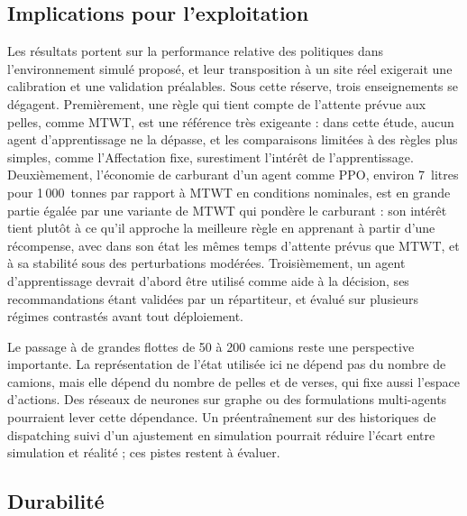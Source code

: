 \documentclass[11pt,a4paper]{article}
\newif\ifrevmarks
\newcommand{\revtag}[1]{\ifrevmarks\textsuperscript{\textcolor{red!70!black}{\scriptsize[#1]}}\fi}
\newenvironment{revbloc}[1]{\par\ifrevmarks\color{revcolor}\noindent\revtag{#1}\ \fi}{\par}
\newif\ifcorrmarks
\newcommand{\corr}[1]{\ifcorrmarks\textcolor{corrcolor}{#1}\else#1\fi}
\begin{document}
\subsection{Implications pour l'exploitation}

\begin{revbloc}{T31}
Les résultats portent sur la performance relative des politiques dans l'environnement simulé proposé, et leur transposition à un site réel exigerait une calibration et une validation préalables. Sous cette réserve, trois enseignements se dégagent. Premièrement, une règle qui tient compte de l'attente prévue aux pelles, comme MTWT, est une référence très exigeante : dans cette étude, aucun agent d'apprentissage ne la dépasse, et les comparaisons limitées à des règles plus simples, comme l'Affectation fixe, surestiment l'intérêt de l'apprentissage. \corr{Deuxièmement, l'économie de carburant d'un agent comme PPO, environ 7~litres pour 1\,000~tonnes par rapport à MTWT en conditions nominales, est en grande partie égalée par une variante de MTWT qui pondère le carburant : son intérêt tient plutôt à ce qu'il approche la meilleure règle en apprenant à partir d'une récompense, avec dans son état les mêmes temps d'attente prévus que MTWT, et à sa stabilité sous des perturbations modérées.} Troisièmement, un agent d'apprentissage devrait d'abord être utilisé comme aide à la décision, ses recommandations étant validées par un répartiteur, et évalué sur plusieurs régimes contrastés avant tout déploiement.

Le passage à de grandes flottes de 50 à 200 camions reste une perspective importante. La représentation de l'état utilisée ici ne dépend pas du nombre de camions, mais elle dépend du nombre de pelles et de verses, qui fixe aussi l'espace d'actions. Des réseaux de neurones sur graphe ou des formulations multi-agents \cite{Zhao2025} pourraient lever cette dépendance. Un préentraînement sur des historiques de dispatching suivi d'un ajustement en simulation pourrait réduire l'écart entre simulation et réalité ; ces pistes restent à évaluer.
\end{revbloc}

\subsection{Durabilité}
\label{sec:sustainability}
\end{document}
